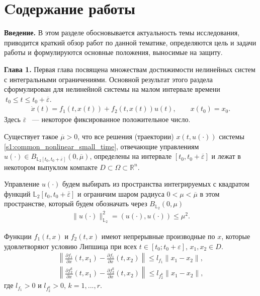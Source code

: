 \documentclass[../main.tex]{subfiles}
\begin{document}
\pagebreak
\section*{Cодержание работы}
\textbf{Введение.} 
В этом разделе обосновывается актуальность темы исследования, приводится краткий обзор работ по данной тематике, определяются цель и задачи работы и формулируются основные положения, выносимые на защиту.


\textbf{Глава 1.}
Первая глава посвящена множествам достижимости нелинейных систем с интегральными ограничениями. 
Основной результат этого раздела сформулирован для нелинейной системы на малом интервале времени $\ t_0 \leqslant t \leqslant t_0 + \overline{\varepsilon} $.
\begin{gather}\label{s1:common_nonlinear_small_time}
	\dot{x}(t)=f_1(t,x(t))+f_2(t,x(t))u(t), \qquad x(t_0) = x_0.
\end{gather}
Здесь $ \overline{\varepsilon} $ ~--- некоторое фиксированное положительное число.

\begin{assumption}\label{s1:as:right_hand_side_conditions_global}
	Существует такое $\overline{\mu} > 0 $, что все решения (траектории) $ x(t, u(\cdot)) $ системы \eqref{s1:common_nonlinear_small_time}, отвечающие управлениям $u(\cdot) \in B_{\mathbb{L}_2[t_0, t_0 + \overline{\varepsilon}]}(0,\overline{\mu})$, определены на интервале $ [t_0,t_0 + \overline{\varepsilon}] $ и лежат в некотором выпуклом компакте $D \subset \Omega \subset \mathbb{R}^n$. 
\end{assumption}

Управление $u(\cdot)$ будем выбирать из пространства интегрируемых с квадратом функций $\mathbb{L}_2[t_0,t_0+\bar{\varepsilon}]$ и ограничим шаром радиуса $ 0 < \mu < \overline{\mu} $ в этом пространстве, который будем обозначать через $B_{\mathbb{L}_2}(0, \mu)$
\begin{gather*}
	\lVert u(\cdot)\rVert^2_{\mathbb{L}_2} = \left(u(\cdot),u(\cdot) \right) \leqslant \mu^2.
\end{gather*}

\begin{assumption}\label{s1:as:right_hand_side_diff_lip}
	Функции $f_1(t,x)$ и $f_2(t,x)$ имеют непрерывные производные по $x$, которые удовлетворяют условию Липшица при всех $t \in [t_0;t_0 + \varepsilon]$, $x_1, x_2 \in D$.
	\begin{gather*}
		\left\| \frac{\partial f_1}{\partial x}(t,x_1) - \frac{\partial f_1}{\partial x}(t,x_2) \right\| \leqslant l_{f_1} \| x_1 - x_2\|, \\
		 \left\| \frac{\partial f_2^k}{\partial x}(t,x_1) - \frac{\partial f_2^k}{\partial x}(t,x_2) \right\| \leqslant l_{f_2^k} \| x_1 - x_2\|,
	\end{gather*}
	где $l_{f_1} > 0$ и $l_{f_2^k} > 0$, $k = 1,...,r$.
\end{assumption}
\end{document}
